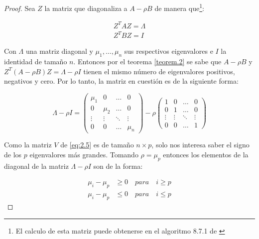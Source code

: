 \begin{proof}
Sea $Z$ la matriz que diagonaliza a $A-\rho B$ de manera que\footnote{El calculo de esta matriz puede obtenerse en el algoritmo 8.7.1 de \cite{golub2012matrix}}:

\begin{equation}\label{eq:2.38}
\begin{aligned}
 Z^T AZ = \Lambda \\ Z^T B Z = I
 \end{aligned}
\end{equation}

Con $\Lambda$ una matriz diagonal y $\mu_1, \ldots,  \mu_n$ sus respectivos eigenvalores e $I$ la identidad de tamaño $n$. Entonces por el teorema \ref{teorem.2} se sabe que $A- \rho B$ y $Z^T(A- \rho B)Z = \Lambda -\rho I$ tienen el mismo número de eigenvalores positivos, negativos y cero. Por lo tanto, la matriz en cuestión es de la siguiente forma:

\begin{equation}\label{eq:2.39}
\Lambda - \rho I = 
\left(\!
    \begin{array}{cccc}
      \mu_1 & 0 & \hdots & 0\\
      0 & \mu_2 & \hdots & 0\\
      \vdots & \vdots & \ddots & \vdots \\
      0 & 0 & \hdots & \mu_n
    \end{array}
  \!\right) - \rho
  \left(\!
    \begin{array}{cccc}
      1 & 0 & \hdots & 0\\
      0 & 1 & \hdots & 0\\
      \vdots & \vdots & \ddots & \vdots \\
      0 & 0 & \hdots & 1
    \end{array}
  \!\right) 
\end{equation} 

Como la  matriz $V$ de \ref{eq:2.5} es de tamaño $n \times p$, solo nos interesa saber el signo de los $p$ eigenvalores más grandes. Tomando $\rho = \mu_p$ entonces los elementos de la diagonal de la matriz $\Lambda- \rho I$ son de la forma:


\begin{equation}\label{eq:2.40}
\begin{aligned}
   \mu_i - \mu_p & \geq 0  \quad para \quad i \geq p\\
   \mu_i - \mu_p & \leq 0  \quad para \quad i \leq p
\end{aligned}
\end{equation} 


\end{proof}
